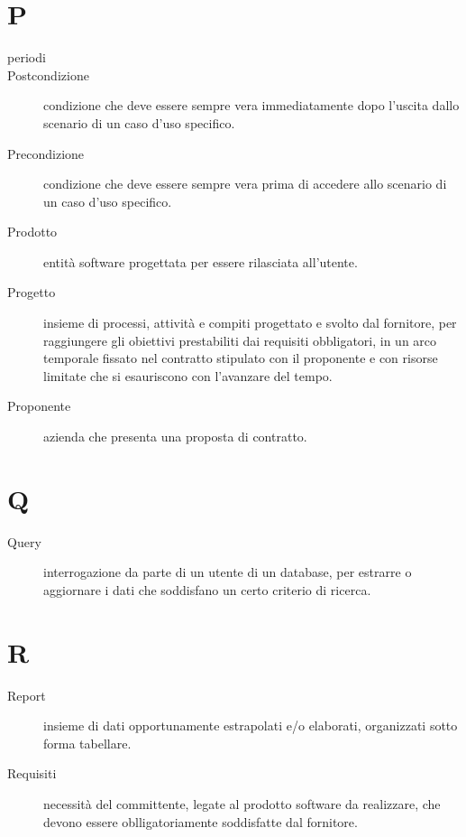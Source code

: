 \documentclass{article}
\begin{document}
	\section{P}
	\begin{description}
		\item[periodi] 
		\item[Postcondizione] condizione che deve essere sempre vera immediatamente dopo l'uscita dallo scenario di un caso d'uso specifico.
		\item[Precondizione] condizione che deve essere sempre vera prima di accedere allo scenario di un caso d'uso specifico.
		\item[Prodotto] entità software progettata per essere rilasciata all'utente.
		\item[Progetto] insieme di processi, attività e compiti progettato e svolto dal fornitore, per raggiungere gli obiettivi prestabiliti dai requisiti obbligatori, in un arco temporale fissato nel contratto stipulato con il proponente e con risorse limitate che si esauriscono con l'avanzare del tempo.
		\item[Proponente] azienda che presenta una proposta di contratto.
	\end{description}
	\section{Q}
	\begin{description}
		\item[Query] interrogazione da parte di un utente di un database, per estrarre o aggiornare i dati che soddisfano un certo criterio di ricerca.
	\end{description}
	\section{R}
	\begin{description}
		\item[Report] insieme di dati opportunamente estrapolati e/o elaborati, organizzati sotto forma tabellare.
		\item[Requisiti] necessità del committente, legate al prodotto software da realizzare, che devono essere oblligatoriamente soddisfatte dal fornitore.
	\end{description}
\end{document}
